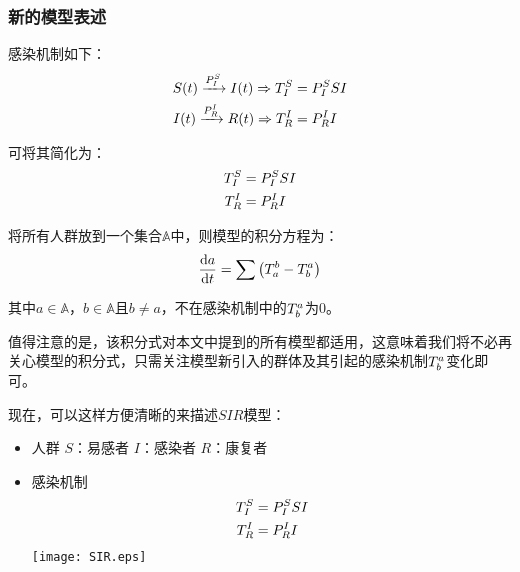 \subsubsection{新的模型表述}
\par 感染机制如下：
\begin{align}
S(t)\xrightarrow{P^{S}_{I}}I(t) \Rightarrow T^{S}_{I}&=P^{S}_{I}SI\\
I(t)\xrightarrow{P^{I}_{R}}R(t) \Rightarrow T^{I}_{R}&=P^{I}_{R}I
\end{align}
\par 可将其简化为：
\begin{align}
T^{S}_{I}&=P^{S}_{I}SI\\
T^{I}_{R}&=P^{I}_{R}I
\end{align}
\par 将所有人群放到一个集合$\mathbb{A}$中，则模型的积分方程为：
\begin{equation}
	\frac{\mathrm{d}a}{\mathrm{d}t} = \sum\left(T^{b}_{a}-T^{a}_{b}\right)
\end{equation}
\par 其中$a\in\mathbb{A}$，$b\in\mathbb{A}$且$b\not=a$，不在感染机制中的$T^{a}_{b}$为$0$。
\par 值得注意的是，该积分式对本文中提到的所有模型都适用，这意味着我们将不必再关心模型的积分式，只需关注模型新引入的群体及其引起的感染机制$T^{a}_{b}$变化即可。
\par 现在，可以这样方便清晰的来描述$SIR$模型：
\begin{itemize}
	\item 人群
	\subitem $S$：易感者
	\subitem $I$：感染者
	\subitem $R$：康复者
	\item 感染机制
	\subitem 
	\begin{align}
	T^{S}_{I}&=P^{S}_{I}SI\\
	T^{I}_{R}&=P^{I}_{R}I
	\end{align}
	\texttt{[image: SIR.eps]}
\end{itemize}
